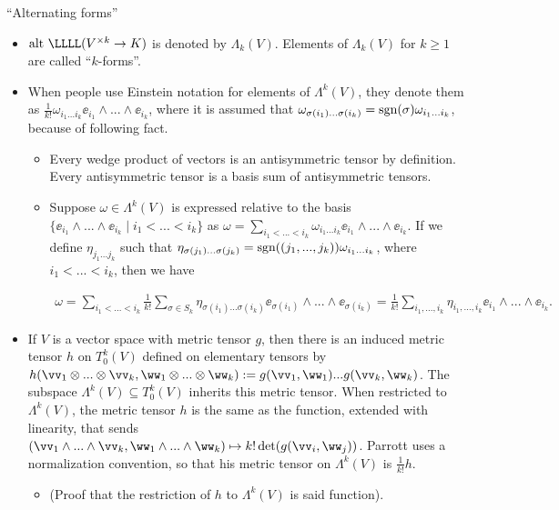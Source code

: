 \documentclass{article}
\begin{document}
``Alternating forms''
\begin{itemize}
    \item $\alt \spc \LLLL(V^{\times k} \rightarrow K)$ is denoted by $\Lambda_k(V)$. Elements of $\Lambda_k(V)$ for $k \geq 1$ are called ``$k$-forms''.
    
    \item When people use Einstein notation for elements of $\Lambda^k(V)$, they denote them as $\frac{1}{k!} \omega_{i_1 ... i_k} \ee_{i_1} \wedge ... \wedge \ee_{i_k}$, where it is assumed that $\omega_{\sigma(i_1) ... \sigma(i_k)} = \text{sgn}(\sigma) \omega_{i_1 ... i_k}$, because of following fact.
    
    \begin{itemize}
        \item Every wedge product of vectors is an antisymmetric tensor by definition. Every antisymmetric tensor is a basis sum of antisymmetric tensors.
        \item Suppose $\omega \in \Lambda^k(V)$ is expressed relative to the basis $\{ \ee_{i_1} \wedge ... \wedge \ee_{i_k} \mid i_1 < ... < i_k \}$ as $\omega = \sum_{i_1 < ... < i_k} \omega_{i_1 ... i_k} \ee_{i_1} \wedge ... \wedge \ee_{i_k}$. If we define $\eta_{j_1 ... j_k}$ such that $\eta_{\sigma(j_1) ... \sigma(j_k)} = \text{sgn}((j_1, ..., j_k)) \omega_{i_1 ... i_k}$, where $i_1 < ... < i_k$, then we have
        
        \begin{align*}
            \omega = \sum_{i_1 < ... < i_k} \frac{1}{k!} \sum_{\sigma \in S_k} \eta_{\sigma(i_1) ... \sigma(i_k)} \ee_{\sigma(i_1)} \wedge ... \wedge \ee_{\sigma(i_k)} = \frac{1}{k!} \sum_{i_1, ..., i_k} \eta_{i_1, ..., i_k} \ee_{i_1} \wedge ... \wedge \ee_{i_k}.
        \end{align*}
    \end{itemize}
    
    \item If $V$ is a vector space with metric tensor $g$, then there is an induced metric tensor $h$ on $T^k_0(V)$ defined on elementary tensors by $h(\vv_1 \otimes ... \otimes \vv_k, \ww_1 \otimes ... \otimes \ww_k) := g(\vv_1, \ww_1) ... g(\vv_k, \ww_k)$. The subspace $\Lambda^k(V) \subseteq T^k_0(V)$ inherits this metric tensor. When restricted to $\Lambda^k(V)$, the metric tensor $h$ is the same as the function, extended with linearity, that sends $(\vv_1 \wedge ... \wedge \vv_k, \ww_1 \wedge ... \wedge \ww_k) \mapsto k! \det(g(\vv_i, \ww_j))$. Parrott uses a normalization convention, so that his metric tensor on $\Lambda^k(V)$ is $\frac{1}{k!} h$.
    \begin{itemize}
        \item (Proof that the restriction of $h$ to $\Lambda^k(V)$ is said function). 
        

\end{itemize}
\end{itemize}
\end{document}
